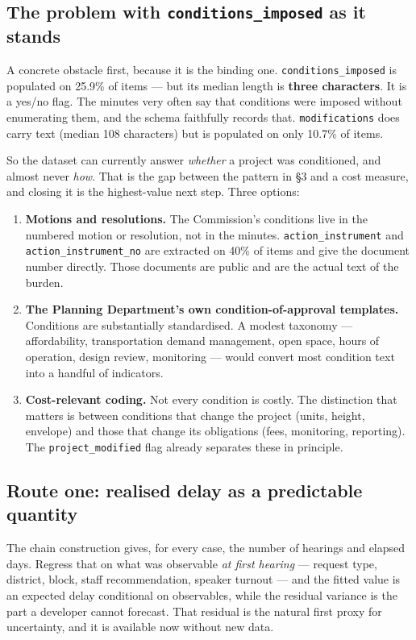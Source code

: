 \documentclass[11pt]{article}
\begin{document}
\subsection{The problem with \texttt{conditions\_imposed} as it stands}

A concrete obstacle first, because it is the binding one. \texttt{conditions\_imposed} is
populated on 25.9\% of items --- but its median length is \textbf{three characters}. It is a
yes/no flag. The minutes very often say that conditions were imposed without enumerating them,
and the schema faithfully records that. \texttt{modifications} does carry text (median 108
characters) but is populated on only 10.7\% of items.

So the dataset can currently answer \emph{whether} a project was conditioned, and almost never
\emph{how}. That is the gap between the pattern in \S3 and a cost measure, and closing it is
the highest-value next step. Three options:

\begin{enumerate}
\item \textbf{Motions and resolutions.} The Commission's conditions live in the numbered motion
or resolution, not in the minutes. \texttt{action\_instrument} and
\texttt{action\_instrument\_no} are extracted on 40\% of items and give the document number
directly. Those documents are public and are the actual text of the burden.
\item \textbf{The Planning Department's own condition-of-approval templates.} Conditions are
substantially standardised. A modest taxonomy --- affordability, transportation demand
management, open space, hours of operation, design review, monitoring --- would convert most
condition text into a handful of indicators.
\item \textbf{Cost-relevant coding.} Not every condition is costly. The distinction that
matters is between conditions that change the project (units, height, envelope) and those that
change its obligations (fees, monitoring, reporting). The \texttt{project\_modified} flag
already separates these in principle.
\end{enumerate}

\subsection{Route one: realised delay as a predictable quantity}

The chain construction gives, for every case, the number of hearings and elapsed days. Regress
that on what was observable \emph{at first hearing} --- request type, district, block, staff
recommendation, speaker turnout --- and the fitted value is an expected delay conditional on
observables, while the residual variance is the part a developer cannot forecast. That
residual is the natural first proxy for uncertainty, and it is available now without new data.
\end{document}
